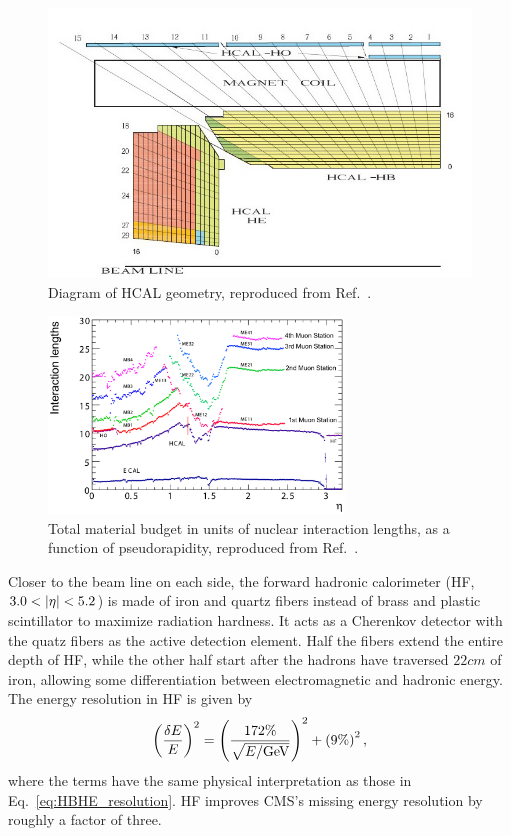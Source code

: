 \begin{figure}[htbp]
  \centering
  \includegraphics[width=\textwidth]{experiment/hcal.png}
  \caption[HCAL geometry]{
    Diagram of HCAL geometry, reproduced from Ref.~\cite{Chatrchyan:2008zzk}.
  }\label{fig:hcal}
\end{figure}

\begin{figure}[htbp]
  \centering
  \includegraphics[width=0.7\textwidth]{experiment/hcalMaterial.png}
  \caption[Total material budget in nuclear interaction lengths]{
    Total material budget in units of nuclear interaction lengths, as a function of pseudorapidity, reproduced from Ref.~\cite{Chatrchyan:2008zzk}.
  }\label{fig:hcalMaterial}
\end{figure}

Closer to the beam line on each side, the forward hadronic calorimeter (HF, $3.0 < \lvert \eta \rvert < 5.2$) is made of iron and quartz fibers instead of brass and plastic scintillator to maximize radiation hardness.
It acts as a Cherenkov detector with the quatz fibers as the active detection element.
Half the fibers extend the entire depth of HF, while the other half start after the hadrons have traversed $22\unit{cm}$ of iron, allowing some differentiation between electromagnetic and hadronic energy.
The energy resolution in HF is given by
\begin{equation}
  \left(\frac{\delta E}{E}\right)^2 = \left(\frac{172\%}{\sqrt{E/\mathrm{Ge\hspace{-.08em}V}}}\right)^2 + \left(9\%\right)^2,
\end{equation}
where the terms have the same physical interpretation as those in Eq.~\ref{eq:HBHE_resolution}.
HF improves CMS's missing energy resolution by roughly a factor of three.



